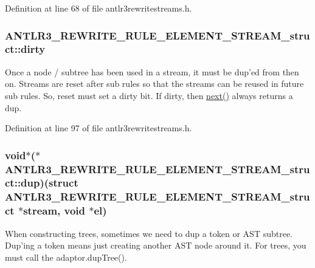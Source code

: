 Definition at line 68 of file antlr3rewritestreams.\-h.

\hypertarget{struct_a_n_t_l_r3___r_e_w_r_i_t_e___r_u_l_e___e_l_e_m_e_n_t___s_t_r_e_a_m__struct_ace76c26ae005d87209376d9aafae6f35}{
\subsubsection[{dirty}]{ A\-N\-T\-L\-R3\-\_\-\-R\-E\-W\-R\-I\-T\-E\-\_\-\-R\-U\-L\-E\-\_\-\-E\-L\-E\-M\-E\-N\-T\-\_\-\-S\-T\-R\-E\-A\-M\-\_\-struct\-::dirty}}\label{struct_a_n_t_l_r3___r_e_w_r_i_t_e___r_u_l_e___e_l_e_m_e_n_t___s_t_r_e_a_m__struct_ace76c26ae005d87209376d9aafae6f35}
Once a node / subtree has been used in a stream, it must be dup'ed from then on. Streams are reset after sub rules so that the streams can be reused in future sub rules. So, reset must set a dirty bit. If dirty, then \hyperlink{struct_a_n_t_l_r3___r_e_w_r_i_t_e___r_u_l_e___e_l_e_m_e_n_t___s_t_r_e_a_m__struct_a49a3d89cea69ba728843b12a5cfd51e3}{next()} always returns a dup. 

Definition at line 97 of file antlr3rewritestreams.\-h.

\hypertarget{struct_a_n_t_l_r3___r_e_w_r_i_t_e___r_u_l_e___e_l_e_m_e_n_t___s_t_r_e_a_m__struct_ae843a201581e7ef94e8c50630a76eaf5}{
\subsubsection[{dup}]{\setlength{\rightskip}{0pt plus 5cm}void$\ast$($\ast$ A\-N\-T\-L\-R3\-\_\-\-R\-E\-W\-R\-I\-T\-E\-\_\-\-R\-U\-L\-E\-\_\-\-E\-L\-E\-M\-E\-N\-T\-\_\-\-S\-T\-R\-E\-A\-M\-\_\-struct\-::dup)(struct {\bf A\-N\-T\-L\-R3\-\_\-\-R\-E\-W\-R\-I\-T\-E\-\_\-\-R\-U\-L\-E\-\_\-\-E\-L\-E\-M\-E\-N\-T\-\_\-\-S\-T\-R\-E\-A\-M\-\_\-struct} $\ast$stream, void $\ast$el)}}\label{struct_a_n_t_l_r3___r_e_w_r_i_t_e___r_u_l_e___e_l_e_m_e_n_t___s_t_r_e_a_m__struct_ae843a201581e7ef94e8c50630a76eaf5}
When constructing trees, sometimes we need to dup a token or A\-S\-T subtree. Dup'ing a token means just creating another A\-S\-T node around it. For trees, you must call the adaptor.\-dup\-Tree(). 

